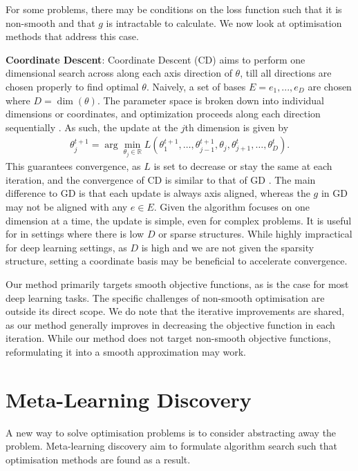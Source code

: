 For some problems, there may be conditions on the loss function such that it is non-smooth and that $g$ is intractable to calculate. We now look at optimisation methods that address this case.

\textbf{Coordinate Descent}: Coordinate Descent (CD) aims to perform one dimensional search across along each axis direction of $\theta$, till all directions are chosen properly to find optimal $\theta$. Naively, a set of bases $E = {e_1, ..., e_D }$ are chosen where $D = \dim(\theta)$. The parameter space is broken down into individual dimensions or coordinates, and optimization proceeds along each direction sequentially \citep{conn2009derivfree}. As such, the update at the $j$th dimension is given by
\begin{align}
    \theta^{t+1}_j = \arg\min_{\theta_j \in \mathbb{R}} L(\theta^{t+1}_1, \dots, \theta^{t+1}_{j-1}, \theta_j, \theta^t_{j+1}, \dots, \theta^t_D).
\end{align}
This guarantees convergence, as $L$ is set to decrease or stay the same at each iteration, and the convergence of CD is similar to that of GD \citep{conn2009derivfree}. The main difference to GD is that each update is always axis aligned, whereas the $g$ in GD may not be aligned with any $e \in E$. Given the algorithm focuses on one dimension at a time, the update is simple, even for complex problems. It is useful for in settings where there is low $D$ or sparse structures. While highly impractical for deep learning settings, as $D$ is high and we are not given the sparsity structure, setting a coordinate basis may be beneficial to accelerate convergence.

Our method primarily targets smooth objective functions, as is the case for most deep learning tasks. The specific challenges of non-smooth optimisation are outside its direct scope. We do note that the iterative improvements are shared, as our method generally improves in decreasing the objective function in each iteration. While our method does not target non-smooth objective functions, reformulating it into a smooth approximation may work.

\section{Meta-Learning Discovery}
\label{sec:meta_learning_discovery}

A new way to solve optimisation problems is to consider abstracting away the problem. Meta-learning discovery aim to formulate algorithm search such that optimisation methods are found as a result.

